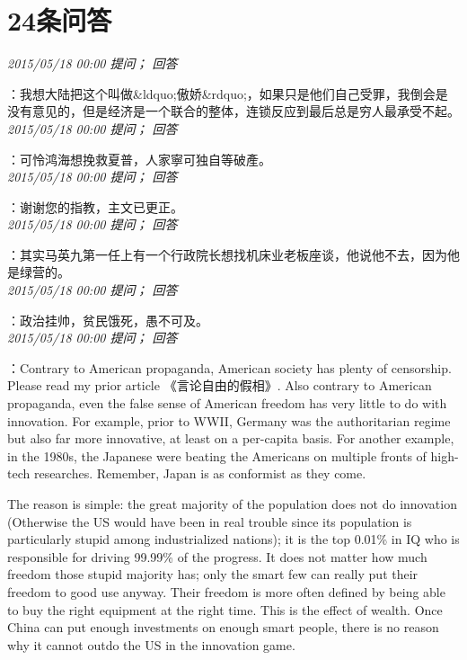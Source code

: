 \documentclass[twocolumn]{ctexart}
\begin{document}
\section{24条问答}

\textit{\hfill\noindent\small 2015/05/18 00:00 提问； 回答}

：我想大陆把这个叫做\&ldquo;傲娇\&rdquo;，如果只是他们自己受罪，我倒会是没有意见的，但是经济是一个联合的整体，连锁反应到最后总是穷人最承受不起。\\

\textit{\hfill\noindent\small 2015/05/18 00:00 提问； 回答}

：可怜鸿海想挽救夏普，人家寧可独自等破產。\\

\textit{\hfill\noindent\small 2015/05/18 00:00 提问； 回答}

：谢谢您的指教，主文已更正。\\

\textit{\hfill\noindent\small 2015/05/18 00:00 提问； 回答}

：其实马英九第一任上有一个行政院长想找机床业老板座谈，他说他不去，因为他是绿营的。\\

\textit{\hfill\noindent\small 2015/05/18 00:00 提问； 回答}

：政治挂帅，贫民饿死，愚不可及。\\

\textit{\hfill\noindent\small 2015/05/18 00:00 提问； 回答}

：Contrary to American propaganda, American society has plenty of censorship. Please read my prior article 《言论自由的假相》. Also contrary to American propaganda, even the false sense of American freedom has very little to do with innovation. For example, prior to WWII, Germany was the authoritarian regime but also far more innovative, at least on a per-capita basis. For another example, in the 1980s, the Japanese were beating the Americans on multiple fronts of high-tech researches. Remember, Japan is as conformist as they come.

The reason is simple: the great majority of the population does not do innovation (Otherwise the US would have been in real trouble since its population is particularly stupid among industrialized nations); it is the top 0.01\% in IQ who is responsible for driving 99.99\% of the progress. It does not matter how much freedom those stupid majority has; only the smart few can really put their freedom to good use anyway. Their freedom is more often defined by being able to buy the right equipment at the right time. This is the effect of wealth. Once China can put enough investments on enough smart people, there is no reason why it cannot outdo the US in the innovation game.
\end{document}
